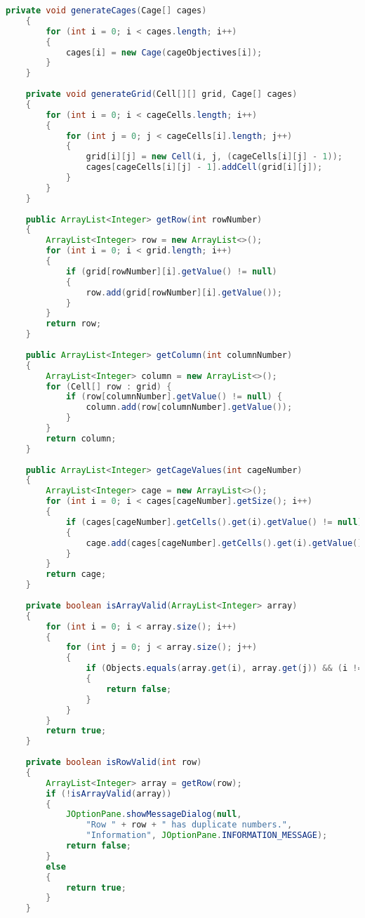 \begin{lstlisting}[language=Java,basicstyle=\tiny,caption=Grid.java]
    private void generateCages(Cage[] cages)
    {
        for (int i = 0; i < cages.length; i++)
        {
            cages[i] = new Cage(cageObjectives[i]);
        }
    }
    
    private void generateGrid(Cell[][] grid, Cage[] cages)
    {
        for (int i = 0; i < cageCells.length; i++)
        {
            for (int j = 0; j < cageCells[i].length; j++)
            {
                grid[i][j] = new Cell(i, j, (cageCells[i][j] - 1));
                cages[cageCells[i][j] - 1].addCell(grid[i][j]);
            }
        }
    }
    
    public ArrayList<Integer> getRow(int rowNumber)
    {
        ArrayList<Integer> row = new ArrayList<>();
        for (int i = 0; i < grid.length; i++)
        {
            if (grid[rowNumber][i].getValue() != null)
            {
                row.add(grid[rowNumber][i].getValue());
            }
        }
        return row;
    }
    
    public ArrayList<Integer> getColumn(int columnNumber)
    {
        ArrayList<Integer> column = new ArrayList<>();
        for (Cell[] row : grid) {
            if (row[columnNumber].getValue() != null) {
                column.add(row[columnNumber].getValue());
            }
        }
        return column;
    }
    
    public ArrayList<Integer> getCageValues(int cageNumber)
    {
        ArrayList<Integer> cage = new ArrayList<>();
        for (int i = 0; i < cages[cageNumber].getSize(); i++)
        {
            if (cages[cageNumber].getCells().get(i).getValue() != null)
            {
                cage.add(cages[cageNumber].getCells().get(i).getValue());
            }
        }
        return cage;
    }
    
    private boolean isArrayValid(ArrayList<Integer> array)
    {
        for (int i = 0; i < array.size(); i++)
        {
            for (int j = 0; j < array.size(); j++)
            {
                if (Objects.equals(array.get(i), array.get(j)) && (i != j))
                {
                    return false;
                }
            }
        }
        return true;
    }
    
    private boolean isRowValid(int row)
    {
        ArrayList<Integer> array = getRow(row);
        if (!isArrayValid(array))
        {
            JOptionPane.showMessageDialog(null, 
                "Row " + row + " has duplicate numbers.",
                "Information", JOptionPane.INFORMATION_MESSAGE);
            return false;
        }
        else
        {
            return true;
        }
    }
    

\end{lstlisting}
